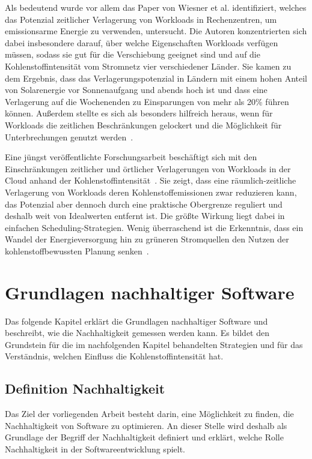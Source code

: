 Als bedeutend wurde vor allem das Paper von Wiesner et al. \cite{Wiesner.2021} identifiziert, welches das Potenzial zeitlicher Verlagerung von Workloads in Rechenzentren, um emissionsarme Energie zu verwenden, untersucht.
Die Autoren konzentrierten sich dabei insbesondere darauf, über welche Eigenschaften Workloads verfügen müssen, sodass sie gut für die Verschiebung geeignet sind und auf die Kohlenstoffintensität vom Stromnetz vier verschiedener Länder.
Sie kamen zu dem Ergebnis, dass das Verlagerungspotenzial in Ländern mit einem hohen Anteil von Solarenergie vor Sonnenaufgang und abends hoch ist und dass eine Verlagerung auf die Wochenenden zu Einsparungen von mehr als 20\% führen können.
Außerdem stellte es sich als besonders hilfreich heraus, wenn für Workloads die zeitlichen Beschränkungen gelockert und die Möglichkeit für Unterbrechungen genutzt werden~\cite{Wiesner.2021}.

Eine jüngst veröffentlichte Forschungsarbeit beschäftigt sich mit den Einschränkungen zeitlicher und örtlicher Verlagerungen von Workloads in der Cloud anhand der Kohlenstoffintensität~\cite{Sukprasert.2023}.
Sie zeigt, dass eine räumlich-zeitliche Verlagerung von Workloads deren Kohlenstoffemissionen zwar reduzieren kann, das Potenzial aber dennoch durch eine praktische Obergrenze reguliert und deshalb weit von Idealwerten entfernt ist.
Die größte Wirkung liegt dabei in einfachen Scheduling-Strategien.
Wenig überraschend ist die Erkenntnis, dass ein Wandel der Energieversorgung hin zu \glqq grüneren\grqq{} Stromquellen den Nutzen der kohlenstoffbewussten Planung senken~\cite{Sukprasert.2023}.
\chapter{Grundlagen nachhaltiger Software}\label{CAP:sustainable-software-basics}
Das folgende Kapitel erklärt die Grundlagen nachhaltiger Software und beschreibt, wie die Nachhaltigkeit gemessen werden kann.
Es bildet den Grundstein für die im nachfolgenden Kapitel behandelten Strategien und für das Verständnis, welchen Einfluss die Kohlenstoffintensität hat.
\section{Definition Nachhaltigkeit}
Das Ziel der vorliegenden Arbeit besteht darin, eine Möglichkeit zu finden, die Nachhaltigkeit von Software zu optimieren.
An dieser Stelle wird deshalb als Grundlage der Begriff der Nachhaltigkeit definiert und erklärt, welche Rolle Nachhaltigkeit in der Softwareentwicklung spielt.

